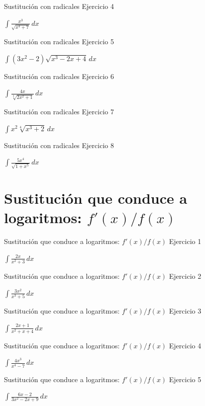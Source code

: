 \documentclass[10pt,aspectratio=169]{beamer}
\newcommand{\ejercicio}[1]{%
  \begin{center}
  \vfill
  {\fontsize{24}{30}\selectfont #1}
  \vfill
  \end{center}
}
\begin{document}
\begin{frame}{Sustitución con radicales}
\small Ejercicio 4
\ejercicio{$\displaystyle \int\frac{x^3}{\sqrt{x^4+7}}\,dx$}
\end{frame}

\begin{frame}{Sustitución con radicales}
\small Ejercicio 5
\ejercicio{$\displaystyle \int(3x^2-2)\sqrt{x^3-2x+4}\,dx$}
\end{frame}

\begin{frame}{Sustitución con radicales}
\small Ejercicio 6
\ejercicio{$\displaystyle \int\frac{4x}{\sqrt[3]{2x^2+1}}\,dx$}
\end{frame}

\begin{frame}{Sustitución con radicales}
\small Ejercicio 7
\ejercicio{$\displaystyle \int x^2\sqrt[4]{x^3+2}\,dx$}
\end{frame}

\begin{frame}{Sustitución con radicales}
\small Ejercicio 8
\ejercicio{$\displaystyle \int\frac{5x^4}{\sqrt{1+x^5}}\,dx$}
\end{frame}

\section{Sustitución que conduce a logaritmos: $f'(x)/f(x)$}
\begin{frame}{Sustitución que conduce a logaritmos: $f'(x)/f(x)$}
\small Ejercicio 1
\ejercicio{$\displaystyle \int\frac{2x}{x^2+3}\,dx$}
\end{frame}

\begin{frame}{Sustitución que conduce a logaritmos: $f'(x)/f(x)$}
\small Ejercicio 2
\ejercicio{$\displaystyle \int\frac{3x^2}{x^3+5}\,dx$}
\end{frame}

\begin{frame}{Sustitución que conduce a logaritmos: $f'(x)/f(x)$}
\small Ejercicio 3
\ejercicio{$\displaystyle \int\frac{2x+1}{x^2+x+4}\,dx$}
\end{frame}

\begin{frame}{Sustitución que conduce a logaritmos: $f'(x)/f(x)$}
\small Ejercicio 4
\ejercicio{$\displaystyle \int\frac{4x^3}{x^4-7}\,dx$}
\end{frame}

\begin{frame}{Sustitución que conduce a logaritmos: $f'(x)/f(x)$}
\small Ejercicio 5
\ejercicio{$\displaystyle \int\frac{6x-2}{3x^2-2x+9}\,dx$}
\end{frame}
\end{document}
